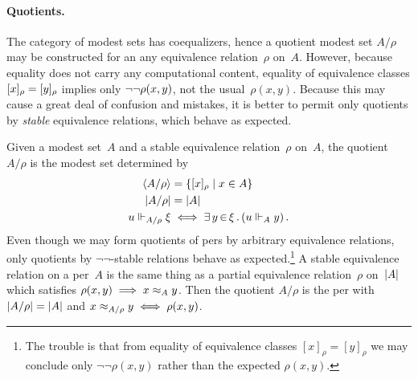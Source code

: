 \paragraph{Quotients.}
%
\iflong
%
The category of modest sets has coequalizers, hence a quotient modest
set $A/\rho$ may be constructed for an any equivalence relation~$\rho$
on~$A$. However, because equality does not carry any computational
content, equality of equivalence classes $[x]_{\rho} =
[y]_{\rho}$ implies only $\lnot \lnot \rho(x,y)$, not the
usual~$\rho(x,y)$. Because this may cause a great deal of confusion
and mistakes, it is better to permit only quotients by \emph{stable}
equivalence relations, which behave as expected.

Given a modest set~$A$ and a stable equivalence relation~$\rho$
on~$A$, the quotient $A/\rho$ is the modest set determined by
\begin{align*}
  \langle A/\rho \rangle &= \{[x]_{\rho} \mid x \in A\} \\
  |A/\rho| &= |A| \\
  u \Vdash_{A/\rho} \xi &\iff \exists\, y \,{\in}\, \xi\,.\left(u \Vdash_A y\right).
\end{align*}
%
\else
%
Even though we may form quotients of pers by arbitrary equivalence
relations, only quotients by $\lnot\lnot$-stable relations behave as
expected.\footnote{The trouble is that from equality of equivalence
  classes $[x]_{\rho} = [y]_{\rho}$ we may conclude only
  $\lnot\lnot\rho(x,y)$ rather than the expected $\rho(x,y)$.}
%
A stable equivalence relation on a per~$A$ is the same thing as a
partial equivalence relation~$\rho$ on~$|A|$ which satisfies
$\rho(x,y) \implies x \approx_A y$. Then the quotient $A/\rho$ is the per
with $|A/\rho| = |A|$ and $x \approx_{A/\rho} y \iff
\rho(x,y)$.
%
\fi

